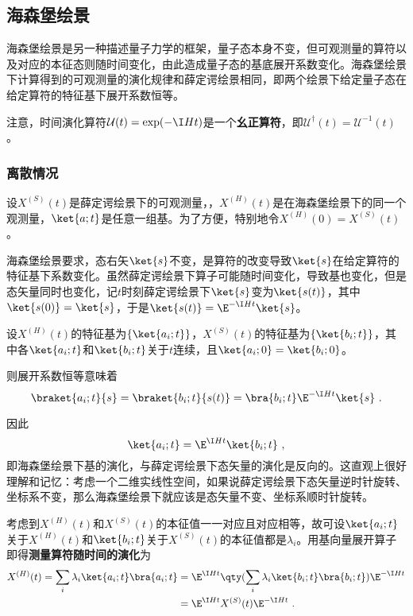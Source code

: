 \subsection{海森堡绘景}

海森堡绘景是另一种描述量子力学的框架，量子态本身不变，但可观测量的算符以及对应的本征态则随时间变化，由此造成量子态的基底展开系数变化。海森堡绘景下计算得到的可观测量的演化规律和薛定谔绘景相同，即两个绘景下给定量子态在给定算符的特征基下展开系数恒等。

注意，时间演化算符$\mathcal{U}(t)=\exp(-\I Ht)$是一个\textbf{幺正算符}，即$\mathcal{U}^\dagger(t)=\mathcal{U}^{-1}(t)$。

\subsubsection{离散情况}



设$X^{(S)}(t)$是薛定谔绘景下的可观测量，，$X^{(H)}(t)$是在海森堡绘景下的同一个观测量，$\ket{a; t}$是任意一组基。为了方便，特别地令$X^{(H)}(0)=X^{(S)}(t)$。


海森堡绘景要求，态右矢$\ket{s}$不变，是算符的改变导致$\ket{s}$在给定算符的特征基下系数变化。虽然薛定谔绘景下算子可能随时间变化，导致基也变化，但是态矢量同时也变化，记$t$时刻薛定谔绘景下$\ket{s}$变为$\ket{s(t)}$，其中$\ket{s(0)}=\ket{s}$，于是$\ket{s(t)}=\E^{-\I H t}\ket{s}$。



设$X^{(H)}(t)$的特征基为$\{\ket{a_i;t}\}$，$X^{(S)}(t)$的特征基为$\{\ket{b_i; t}\}$，其中各$\ket{a_i; t}$和$\ket{b_i; t}$关于$t$连续，且$\ket{a_i; 0}=\ket{b_i; 0}$。

则展开系数恒等意味着
\begin{equation}
\braket{a_i; t}{s} = \braket{b_i; t}{s(t)} = \bra{b_i; t}\E^{-\I H t}\ket{s}~. 
\end{equation}

因此
\begin{equation}\label{eq_HsbPic_3}
\ket{a_i; t} = \E^{\I H t}\ket{b_i; t}~, 
\end{equation}
即海森堡绘景下基的演化，与薛定谔绘景下态矢量的演化是反向的。这直观上很好理解和记忆：考虑一个二维实线性空间，如果说薛定谔绘景下态矢量逆时针旋转、坐标系不变，那么海森堡绘景下就应该是态矢量不变、坐标系顺时针旋转。

考虑到$X^{(H)}(t)$和$X^{(S)}(t)$的本征值一一对应且对应相等，故可设$\ket{a_i; t}$关于$X^{(H)}(t)$和$\ket{b_i; t}$关于$X^{(S)}(t)$的本征值都是$\lambda_i$。用基向量展开算子即得\textbf{测量算符随时间的演化}为
\begin{equation}\label{eq_HsbPic_2}
\begin{aligned}
X^{(H)}(t) = \sum_i \lambda_i \ket{a_i; t}\bra{a_i; t} ={}& \E^{\I H t}\qty(\sum_i \lambda_i \ket{b_i; t}\bra{b_i; t})\E^{-\I H t}\\
={}& \E^{\I H t}X^{(S)}(t)\E^{-\I H t}~.
\end{aligned}
\end{equation}

